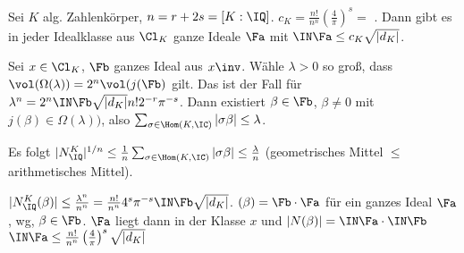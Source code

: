 \begin{Satz}
 Sei $K$ alg. Zahlenkörper, $n=r+2s=[K:\IQ]$. $c_K=\frac{n!}{n^n}\left(\frac{4}{\pi}\right)^s=$ .
 Dann gibt es in jeder Idealklasse aus $\Cl_K$ ganze Ideale $\Fa$ mit $\IN\Fa\leq c_K\sqrt{|d_K|}$.
\end{Satz}

\begin{Beweis}
 Sei $x\in \Cl_K$, $\Fb$ ganzes Ideal aus $x\inv$. Wähle $\lambda>0$ so groß, dass $\vol(\Omega(\lambda))=2^n\vol(j(\Fb)$ gilt. Das ist der Fall für $\lambda^n=2^n\IN\Fb\sqrt{|d_K|}n!2^{-r}\pi^{-s}$. Dann existiert $\beta\in\Fb$, $\beta\neq 0$ mit $j(\beta)\in\Omega(\lambda))$, also $\sum_{\sigma\in \Hom(K,\IC)} |\sigma\beta|\leq \lambda$.
 
 Es folgt $|N_\IQ^K|^{1/n}\leq \frac{1}{n}\sum_{\sigma\in\Hom(K,\IC)} |\sigma\beta| \leq \frac{\lambda}{n}$ (geometrisches Mittel $\leq$ arithmetisches Mittel).
 
 \folge $|N_\IQ^K(\beta)|\leq \frac{\lambda^n}{n^n}=\frac{n!}{n^n} 4^s\pi^{-s} \IN\Fb \sqrt{|d_K|}$. $(\beta)=\Fb\cdot\Fa$ für ein ganzes Ideal $\Fa$, wg, $\beta\in\Fb$. $\Fa$ liegt dann in der Klasse $x$ und $|N(\beta)|=\IN\Fa\cdot \IN\Fb$ \folge $\IN\Fa \leq \frac{n!}{n^n}\left( \frac{4}{\pi}\right)^s\sqrt{|d_K|}$
\end{Beweis}

